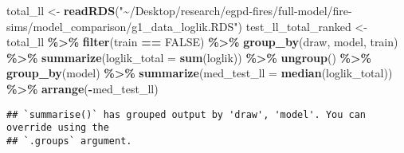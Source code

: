 \documentclass[
]{article}
\newenvironment{Shaded}{\begin{snugshade}}{\end{snugshade}}
\newcommand{\AttributeTok}[1]{\textcolor[rgb]{0.13,0.29,0.53}{#1}}
\newcommand{\ConstantTok}[1]{\textcolor[rgb]{0.56,0.35,0.01}{#1}}
\newcommand{\FunctionTok}[1]{\textcolor[rgb]{0.13,0.29,0.53}{\textbf{#1}}}
\newcommand{\NormalTok}[1]{#1}
\newcommand{\OtherTok}[1]{\textcolor[rgb]{0.56,0.35,0.01}{#1}}
\newcommand{\SpecialCharTok}[1]{\textcolor[rgb]{0.81,0.36,0.00}{\textbf{#1}}}
\newcommand{\StringTok}[1]{\textcolor[rgb]{0.31,0.60,0.02}{#1}}
\begin{document}
\begin{Shaded}
\begin{Highlighting}[]
\NormalTok{total\_ll }\OtherTok{\textless{}{-}} \FunctionTok{readRDS}\NormalTok{(}\StringTok{"\textasciitilde{}/Desktop/research/egpd{-}fires/full{-}model/fire{-}sims/model\_comparison/g1\_data\_loglik.RDS"}\NormalTok{)}
\NormalTok{test\_ll\_total\_ranked }\OtherTok{\textless{}{-}}\NormalTok{ total\_ll }\SpecialCharTok{\%\textgreater{}\%} \FunctionTok{filter}\NormalTok{(train }\SpecialCharTok{==} \ConstantTok{FALSE}\NormalTok{) }\SpecialCharTok{\%\textgreater{}\%} 
  \FunctionTok{group\_by}\NormalTok{(draw, model, train) }\SpecialCharTok{\%\textgreater{}\%}
  \FunctionTok{summarize}\NormalTok{(}\AttributeTok{loglik\_total =} \FunctionTok{sum}\NormalTok{(loglik)) }\SpecialCharTok{\%\textgreater{}\%} \FunctionTok{ungroup}\NormalTok{() }\SpecialCharTok{\%\textgreater{}\%}
  \FunctionTok{group\_by}\NormalTok{(model) }\SpecialCharTok{\%\textgreater{}\%} 
  \FunctionTok{summarize}\NormalTok{(}\AttributeTok{med\_test\_ll =} \FunctionTok{median}\NormalTok{(loglik\_total)) }\SpecialCharTok{\%\textgreater{}\%} \FunctionTok{arrange}\NormalTok{(}\SpecialCharTok{{-}}\NormalTok{med\_test\_ll)}
\end{Highlighting}
\end{Shaded}

\begin{verbatim}
## `summarise()` has grouped output by 'draw', 'model'. You can override using the
## `.groups` argument.
\end{verbatim}
\end{document}
